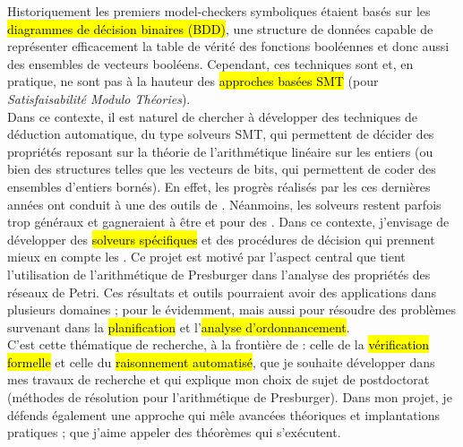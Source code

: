 Historiquement les premiers model-checkers symboliques étaient basés sur les
\hl{diagrammes de décision binaires (BDD)}, une structure de données capable de
représenter efficacement la table de vérité des fonctions booléennes et donc
aussi des ensembles de vecteurs booléens. Cependant, ces techniques sont
 et, en pratique, ne sont pas à la hauteur des
\hl{approches basées SMT} (pour \emph{Satisfaisabilité Modulo Théories}).\\

Dans ce contexte, il est naturel de chercher à développer des techniques de
déduction automatique, du type solveurs SMT, qui permettent de décider des
propriétés reposant sur la théorie de l'arithmétique linéaire sur les entiers
(ou bien des structures telles que les vecteurs de bits, qui permettent de coder
des ensembles d'entiers bornés).
En effet, les progrès réalisés par les  ces dernières années
ont conduit à une  des outils de .
Néanmoins, les solveurs restent parfois trop généraux et gagneraient à être
 et  pour des . Dans ce
contexte, j'envisage de développer des \hl{solveurs spécifiques} et des
procédures de décision qui prennent mieux en compte les . Ce projet est motivé par l'aspect central que tient l'utilisation de
l'arithmétique de Presburger dans l'analyse des propriétés des réseaux de Petri.
Ces résultats et outils pourraient avoir des applications dans plusieurs
domaines ; pour le  évidemment, mais aussi pour résoudre des
problèmes survenant dans la \hl{planification} et l'\hl{analyse
d'ordonnancement}.\\

C'est cette thématique de recherche, à la frontière de  :
celle de la \hl{vérification formelle} et celle du \hl{raisonnement automatisé},
que je souhaite développer dans mes travaux de recherche et qui explique mon
choix de sujet de postdoctorat (méthodes de résolution pour l'arithmétique de
Presburger). Dans mon projet, je défends également une approche qui mêle
avancées théoriques et implantations pratiques ; que j'aime appeler des \og
théorèmes qui s'exécutent\fg.\\

